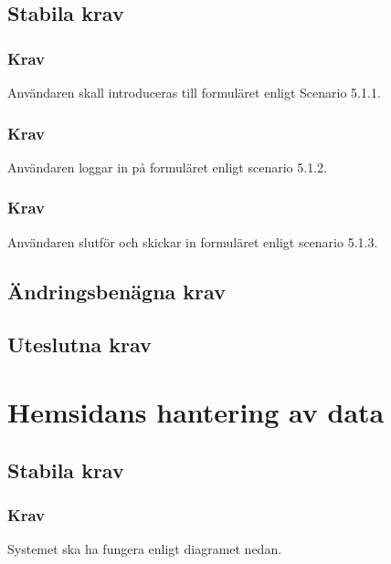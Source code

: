 \documentclass{article}
\begin{document}
    \subsection{Stabila krav}
    
     \subsubsection{Krav}
    Användaren skall introduceras till formuläret enligt Scenario 5.1.1.
    
    \subsubsection{Krav}
    Användaren loggar in på formuläret enligt scenario 5.1.2.
    
    \subsubsection{Krav}
    Användaren slutför och skickar in formuläret enligt scenario 5.1.3.
    
    \subsection{Ändringsbenägna krav}
    \subsection{Uteslutna krav}
    
    \newpage
     \section{Hemsidans hantering av data}
    
    \subsection{Stabila krav}
    \subsubsection{Krav}
    Systemet ska ha fungera enligt diagramet nedan.
    
\end{document}
